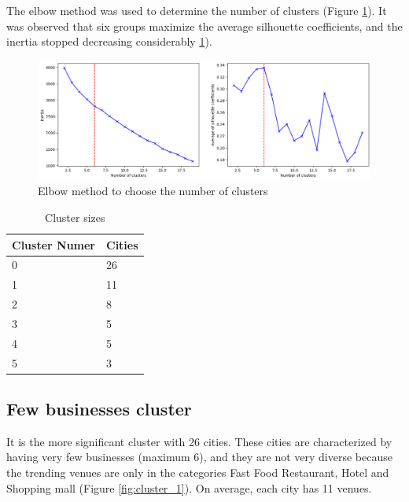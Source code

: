 \documentclass[letterpaper,12pt]{article}
\begin{document}
The elbow method was used to determine the number of clusters (Figure \ref{fig:metrics}). It was observed that six groups maximize the average silhouette coefficients, and the inertia stopped decreasing considerably \ref{tab:my-table}).

\begin{figure}[h]
    \centering
    \includegraphics[width=\textwidth]{images/metrics.png}
    \caption{Elbow method to choose the number of clusters}
    \label{fig:metrics}
\end{figure}

\begin{table}[]
\centering
\caption{Cluster sizes}
\label{tab:my-table}
\begin{tabular}{@{}ll@{}}
\toprule
Cluster Numer & Cities \\ \midrule
0             & 26     \\
1             & 11      \\
2             & 8      \\
3             & 5      \\
4             & 5      \\
5             & 3      \\ \bottomrule
\end{tabular}
\end{table}


\subsection{Few businesses cluster}

It is the more significant cluster with 26 cities.  These cities are characterized by having very few businesses (maximum 6), and they are not very diverse because the trending venues are only in the categories Fast Food Restaurant, Hotel and Shopping mall (Figure \ref{fig:cluster_1}). On average, each city has 11 venues.
\end{document}
